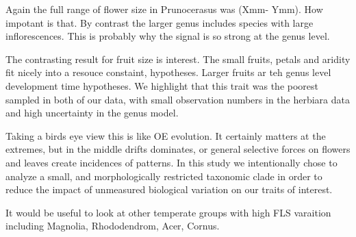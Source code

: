 \documentclass{article}[11pt]
\begin{document}
Again the full range of flower size in Prunocerasus was (Xmm- Ymm). How impotant is that. By contrast the larger genus includes species with large inflorescences. This is probably why the signal is so strong at the genus level.

The contrasting result for fruit size is interest. The small fruits, petals and aridity fit nicely into a resouce constaint, hypotheses. Larger fruits ar teh genus level development time hypotheses. We highlight that this trait was the poorest sampled in both of our data, with small observation numbers in the herbiara data and high uncertainty in the genus model.

Taking a birds eye view this is like OE evolution. It certainly matters at the extremes, but in the middle drifts dominates, or general selective forces on flowers and leaves create incidences of patterns. In this study we intentionally chose to analyze a small, and morphologically restricted taxonomic clade in order to reduce the impact of unmeasured biological variation on our traits of interest.

It would be useful to look at other temperate  groups with high FLS varaition including Magnolia, Rhododendrom, Acer, Cornus.




\end{document}
